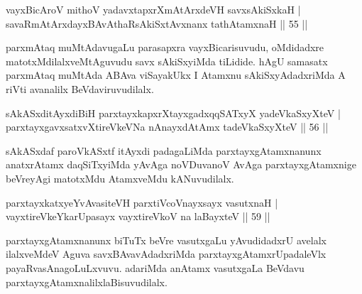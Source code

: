 \begin{shl}
vayxBicAroV mithoV yadavxtapxrXmAtArxdeVH savxsAkiSxkaH |\\
savaRmAtArxdayxBAvAthaRsAkiSxtAvxnanx tathA\s \s tamxnaH \hfill || 55 ||
\end{shl}

\begin{artha}
parxmAtaq muMtAdavugaLu parasapxra vayxBicarisuvudu, oMdidadxre matotxMdilalxveMtAguvudu savx sAkiSxyiMda tiLidide. hAgU samasatx parxmAtaq muMtAda ABAva viSayakUkx I Atamxnu sAkiSxyAdadxriMda A riVti avanalilx BeVdaviruvudilalx.
\end{artha}

\begin{shl}
sAkASxditAyxdiBiH parxtayxkapxrXtayxgadxqqSATxyX yadeVkaSxyXteV |\\
parxtayxgavxsatxvXtireVkeVNa nAnayxdAtAmx tadeVkaSxyXteV \hfill || 56 ||
\end{shl}

\begin{artha}
sAkASxdaf paroVkASxtf itAyxdi padagaLiMda parxtayxgAtamxnanunx anatxrAtamx daqSiTxyiMda yAvAga noVDuvanoV AvAga parxtayxgAtamxnige beVreyAgi matotxMdu AtamxveMdu kANuvudilalx.
\end{artha}



\begin{shl}
parxtayxkatxyeYvAvasiteVH parxtiVcoV\s nayxsayx vasutxnaH |\\
vayxtireVkeYkarUpasayx vayxtireVkoV na laBayxteV \hfill || 59 ||
\end{shl}

\begin{artha}%
parxtayxgAtamxnanunx biTuTx beVre vasutxgaLu yAvudidadxrU avelalx ilalxveMdeV Aguva savxBAvavAdadxriMda  parxtayxgAtamxrUpadaleVlx payaRvasAnagoLuLxvuvu. adariMda anAtamx vasutxgaLa BeVdavu parxtayxgAtamxnalilx\break laBisuvudilalx.
\end{artha}

